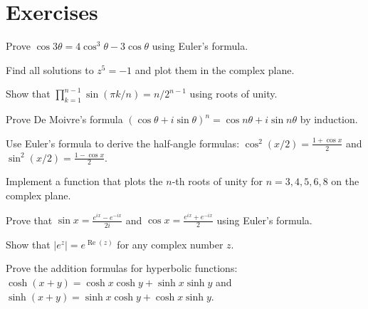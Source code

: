\section{Exercises}

\begin{exercise}
Prove $\cos 3\theta = 4\cos^3\theta - 3\cos\theta$ using Euler's formula.
\end{exercise}

\begin{exercise}
Find all solutions to $z^5 = -1$ and plot them in the complex plane.
\end{exercise}

\begin{exercise}
Show that $\prod_{k=1}^{n-1} \sin(\pi k/n) = n/2^{n-1}$ using roots of unity.
\end{exercise}

\begin{exercise}[Proof]
Prove De Moivre's formula $(\cos\theta + i\sin\theta)^n = \cos n\theta + i\sin n\theta$ by induction.
\end{exercise}

\begin{exercise}
Use Euler's formula to derive the half-angle formulas: $\cos^2(x/2) = \frac{1+\cos x}{2}$ and $\sin^2(x/2) = \frac{1-\cos x}{2}$.
\end{exercise}

\begin{exercise}[Computational]
Implement a function that plots the $n$-th roots of unity for $n = 3, 4, 5, 6, 8$ on the complex plane.
\end{exercise}

\begin{exercise}
Prove that $\sin x = \frac{e^{ix} - e^{-ix}}{2i}$ and $\cos x = \frac{e^{ix} + e^{-ix}}{2}$ using Euler's formula.
\end{exercise}

\begin{exercise}
Show that $|e^{z}| = e^{\operatorname{Re}(z)}$ for any complex number $z$.
\end{exercise}

\begin{exercise}
Prove the addition formulas for hyperbolic functions: $\cosh(x+y) = \cosh x \cosh y + \sinh x \sinh y$ and $\sinh(x+y) = \sinh x \cosh y + \cosh x \sinh y$.
\end{exercise}
